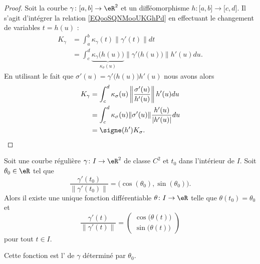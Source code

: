 \begin{proof}
	Soit la courbe \( \gamma\colon \mathopen[ a , b \mathclose]\to \eR^2\) et un difféomorphisme \( h\colon \mathopen[ a , b \mathclose]\to \mathopen[ c , d \mathclose]\). Il s'agit d'intégrer la relation \eqref{EQooSQNMooUKGhPd} en effectuant le changement de variables \( t=h(u)\) :
	\begin{subequations}
		\begin{align}
			K_{\gamma} & =\int_a^b\kappa_{\gamma}(t)\| \gamma'(t) \|dt                                                                   \\
			           & =\int_c^d\underbrace{\kappa_{\gamma}\big( h(u) \big)}_{\kappa_{\sigma}(u)}\| \gamma'\big( h(u) \big) \|h'(u)du.
		\end{align}
	\end{subequations}
	En utilisant le fait que \( \sigma'(u)=\gamma'\big( h(u) \big)h'(u)  \) nous avons alors
	\begin{subequations}
		\begin{align}
			K_{\gamma} & =\int_{c}^d\kappa_{\sigma}(u)\left\| \frac{ \sigma'(u) }{ h'(u) }   \right\|h'(u)du \\
			           & =\int_c^d\kappa_{\sigma}(u)\| \sigma'(u) \|\frac{ h'(u) }{ | h'(u) | }du            \\
			           & =\signe(h')K_{\sigma}.
		\end{align}
	\end{subequations}
\end{proof}

\begin{lemmaDef}     \label{LEMDEFooLPWJooAnWZjb}
	Soit une courbe régulière \( \gamma\colon I\to \eR^2\) de classe \( C^2\) et \( t_0\) dans l'intérieur de \( I\). Soit \( \theta_0 \in \eR\) tel que
	\begin{equation}
		\frac{ \gamma'(t_0)  }{ \| \gamma'(t_0) \| }=\big( \cos(\theta_0),\sin(\theta_0) \big).
	\end{equation}
	Alors il existe une unique fonction différentiable \( \theta\colon I\to \eR\) telle que \( \theta(t_0)=\theta_0\) et
	\begin{equation}
		\frac{ \gamma'(t) }{ \| \gamma'(t) \| }=\begin{pmatrix}
			\cos\big( \theta(t) \big) \\
			\sin\big( \theta(t) \big)
		\end{pmatrix}
	\end{equation}
	pour tout \( t\in I\).

	Cette fonction est l' de \( \gamma\) déterminé par \( \theta_0\).
\end{lemmaDef}

